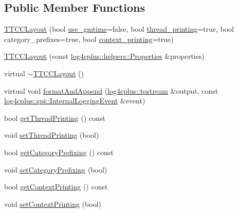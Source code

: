 \subsection*{Public Member Functions}
\begin{DoxyCompactItemize}
\item 
\hyperlink{classlog4cplus_1_1TTCCLayout_ac88ad80bdd4d4aa0a417e985219939d9}{T\-T\-C\-C\-Layout} (bool \hyperlink{classlog4cplus_1_1TTCCLayout_a58ef0436c87f4ce6887903ff48747190}{use\-\_\-gmtime}=false, bool \hyperlink{classlog4cplus_1_1TTCCLayout_a4aa56cdb7306c3fae1a2d4fcab796acf}{thread\-\_\-printing}=true, bool category\-\_\-prefixes=true, bool \hyperlink{classlog4cplus_1_1TTCCLayout_ab4d7656df1d9688045231c93bb0e09fb}{context\-\_\-printing}=true)
\item 
\hyperlink{classlog4cplus_1_1TTCCLayout_a7cdde509c3250b91504d89fab4e60d87}{T\-T\-C\-C\-Layout} (const \hyperlink{classlog4cplus_1_1helpers_1_1Properties}{log4cplus\-::helpers\-::\-Properties} \&properties)
\item 
virtual \hyperlink{classlog4cplus_1_1TTCCLayout_ac2d44af92202942886dd69721b2dff58}{$\sim$\-T\-T\-C\-C\-Layout} ()
\item 
virtual void \hyperlink{classlog4cplus_1_1TTCCLayout_ac1ccbeb83be9a15f15f67bb2690a8f1b}{format\-And\-Append} (\hyperlink{namespacelog4cplus_aef9e0c9a1adafed82c39fdef478716e1}{log4cplus\-::tostream} \&output, const \hyperlink{classlog4cplus_1_1spi_1_1InternalLoggingEvent}{log4cplus\-::spi\-::\-Internal\-Logging\-Event} \&event)
\item 
bool \hyperlink{classlog4cplus_1_1TTCCLayout_ad4a3e26bd561e5290a68faa3434a64d5}{get\-Thread\-Printing} () const 
\item 
void \hyperlink{classlog4cplus_1_1TTCCLayout_a4ddc27c9548ab2c895f6bd2018424d78}{set\-Thread\-Printing} (bool)
\item 
bool \hyperlink{classlog4cplus_1_1TTCCLayout_af7701900a6fbd97fdb9ec65aa285a14d}{get\-Category\-Prefixing} () const 
\item 
void \hyperlink{classlog4cplus_1_1TTCCLayout_a39abda7c4713dcf4980eb350171fe1f7}{set\-Category\-Prefixing} (bool)
\item 
bool \hyperlink{classlog4cplus_1_1TTCCLayout_ad3bb0bef33f5d1ad85c8091543ea9f33}{get\-Context\-Printing} () const 
\item 
void \hyperlink{classlog4cplus_1_1TTCCLayout_a3c47d5297ff91938e9f663545067aa77}{set\-Context\-Printing} (bool)
\end{DoxyCompactItemize}
